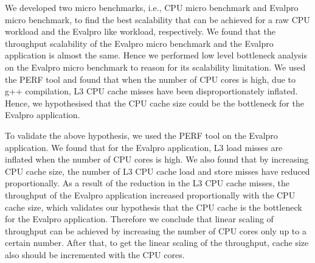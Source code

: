 \documentclass{iitbreport}
\begin{document}
We developed two micro benchmarks, i.e., CPU micro benchmark and Evalpro micro benchmark, to find the best scalability that can be achieved for a raw CPU workload and the Evalpro like workload, respectively. We found that the throughput scalability of the Evalpro micro benchmark and the Evalpro application is almost the same. Hence  we performed low level bottleneck analysis on the Evalpro micro benchmark to  reason for its scalability limitation. We used the PERF tool and found that when the number of CPU cores is high, due to g++ compilation, L3 CPU cache misses have been disproportionately inflated. Hence, we hypothesised that the CPU cache size could be the bottleneck for the Evalpro application. 

To validate the above hypothesis, we used the PERF tool on the Evalpro application. We found that for the Evalpro application, L3 load misses are inflated when the number of CPU cores is high. We also found that by increasing  CPU cache size, the number of L3 CPU cache load and store misses have reduced proportionally. As a result of the reduction in the L3 CPU cache misses, the throughput of the Evalpro application increased proportionally with the CPU cache size, which validates our hypothesis that the CPU cache is the bottleneck for the Evalpro application. Therefore we conclude that linear scaling of throughput can be achieved by increasing the number of CPU cores only up to a certain number. After that, to get the linear scaling of the throughput, cache size also should be incremented with the CPU cores.
\end{document}

